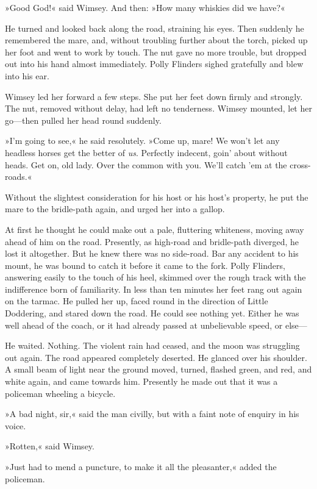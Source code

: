 »Good God!« said Wimsey. And then: »How many whiskies did we have?«

He turned and looked back along the road, straining his eyes. Then suddenly he remembered the mare, and, without troubling further about the torch, picked up her foot and went to work by touch. The nut gave no more trouble, but dropped out into his hand almost immediately. Polly Flinders sighed gratefully and blew into his ear.

Wimsey led her forward a few steps. She put her feet down firmly and strongly. The nut, removed without delay, had left no tenderness. Wimsey mounted, let her go—then pulled her head round suddenly.

»I'm going to see,« he said resolutely. »Come up, mare! We won't let any headless horses get the better of \textit{us}. Perfectly indecent, goin' about without heads. Get on, old lady. Over the common with you. We'll catch 'em at the cross-roads.«

Without the slightest consideration for his host or his host's property, he put the mare to the bridle-path again, and urged her into a gallop.

At first he thought he could make out a pale, fluttering whiteness, moving away ahead of him on the road. Presently, as high-road and bridle-path diverged, he lost it altogether. But he knew there was no side-road. Bar any accident to his mount, he was bound to catch it before it came to the fork. Polly Flinders, answering easily to the touch of his heel, skimmed over the rough track with the indifference born of familiarity. In less than ten minutes her feet rang out again on the tarmac. He pulled her up, faced round in the direction of Little Doddering, and stared down the road. He could see nothing yet. Either he was well ahead of the coach, or it had already passed at unbelievable speed, or else—

He waited. Nothing. The violent rain had ceased, and the moon was struggling out again. The road appeared completely deserted. He glanced over his shoulder. A small beam of light near the ground moved, turned, flashed green, and red, and white again, and came towards him. Presently he made out that it was a policeman wheeling a bicycle.

»A bad night, sir,« said the man civilly, but with a faint note of enquiry in his voice.

»Rotten,« said Wimsey.

»Just had to mend a puncture, to make it all the pleasanter,« added the policeman.

